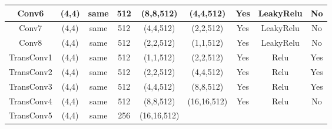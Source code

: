 \documentclass[a4paper,fleqn]{cas-dc}
\begin{document}
\begin{table}[htbp]
\begin{tabular}{|c|c|c|c|c|c|c|c|c|}
{\color[HTML]{000000} Conv6} &
  {\color[HTML]{000000} (4,4)} &
  {\color[HTML]{000000} same} &
  {\color[HTML]{000000} 512} &
  {\color[HTML]{000000} (8,8,512)} &
  {\color[HTML]{000000} (4,4,512)} &
  {\color[HTML]{000000} Yes} &
  {\color[HTML]{000000} LeakyRelu} &
  {\color[HTML]{000000} No} \\ \hline
{\color[HTML]{000000} Conv7} &
  {\color[HTML]{000000} (4,4)} &
  {\color[HTML]{000000} same} &
  {\color[HTML]{000000} 512} &
  {\color[HTML]{000000} (4,4,512)} &
  {\color[HTML]{000000} (2,2,512)} &
  {\color[HTML]{000000} Yes} &
  {\color[HTML]{000000} LeakyRelu} &
  {\color[HTML]{000000} No} \\ \hline
{\color[HTML]{000000} Conv8} &
  {\color[HTML]{000000} (4,4)} &
  {\color[HTML]{000000} same} &
  {\color[HTML]{000000} 512} &
  {\color[HTML]{000000} (2,2,512)} &
  {\color[HTML]{000000} (1,1,512)} &
  {\color[HTML]{000000} Yes} &
  {\color[HTML]{000000} LeakyRelu} &
  {\color[HTML]{000000} No} \\ \hline
{\color[HTML]{000000} TransConv1} &
  {\color[HTML]{000000} (4,4)} &
  {\color[HTML]{000000} same} &
  {\color[HTML]{000000} 512} &
  {\color[HTML]{000000} (1,1,512)} &
  {\color[HTML]{000000} (2,2,512)} &
  {\color[HTML]{000000} Yes} &
  {\color[HTML]{000000} Relu} &
  {\color[HTML]{000000} Yes} \\ \hline
{\color[HTML]{000000} TransConv2} &
  {\color[HTML]{000000} (4,4)} &
  {\color[HTML]{000000} same} &
  {\color[HTML]{000000} 512} &
  {\color[HTML]{000000} (2,2,512)} &
  {\color[HTML]{000000} (4,4,512)} &
  {\color[HTML]{000000} Yes} &
  {\color[HTML]{000000} Relu} &
  {\color[HTML]{000000} Yes} \\ \hline
{\color[HTML]{000000} TransConv3} &
  {\color[HTML]{000000} (4,4)} &
  {\color[HTML]{000000} same} &
  {\color[HTML]{000000} 512} &
  {\color[HTML]{000000} (4,4,512)} &
  {\color[HTML]{000000} (8,8,512)} &
  {\color[HTML]{000000} Yes} &
  {\color[HTML]{000000} Relu} &
  {\color[HTML]{000000} Yes} \\ \hline
{\color[HTML]{000000} TransConv4} &
  {\color[HTML]{000000} (4,4)} &
  {\color[HTML]{000000} same} &
  {\color[HTML]{000000} 512} &
  {\color[HTML]{000000} (8,8,512)} &
  {\color[HTML]{000000} (16,16,512)} &
  {\color[HTML]{000000} Yes} &
  {\color[HTML]{000000} Relu} &
  {\color[HTML]{000000} No} \\ \hline
{\color[HTML]{000000} TransConv5} &
  {\color[HTML]{000000} (4,4)} &
  {\color[HTML]{000000} same} &
  {\color[HTML]{000000} 256} &
  {\color[HTML]{000000} (16,16,512)} &

\end{tabular}
\end{table}
\end{document}

